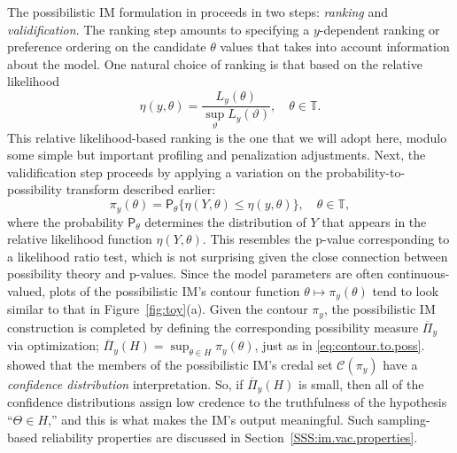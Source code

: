 \documentclass[12pt]{article}
\def\TT{\mathbb{T}}
\def\prob{\mathsf{P}}
\def\cred{\mathscr{C}}
\def\uPi{\overline{\Pi}}
\begin{document}
The possibilistic IM formulation in \citet{martin2022valid2} proceeds in two steps: {\em ranking} and {\em validification}.  The ranking step amounts to specifying a $y$-dependent ranking or preference ordering on the candidate $\theta$ values that takes into account information about the model.  One natural choice of ranking is that based on the relative likelihood 
\begin{equation}
\label{eq:rellik}
\eta(y,\theta) = \frac{L_y(\theta)}{\sup_\vartheta L_y(\vartheta)}, \quad \theta \in \TT.
\end{equation}
This relative likelihood-based ranking is the one that we will adopt here, modulo some simple but important profiling and penalization adjustments.  Next, the validification step proceeds by applying a variation on the probability-to-possibility transform described earlier:
\begin{equation}
\label{eq:contour0}
\pi_y(\theta) = \prob_\theta\{ \eta(Y,\theta) \leq \eta(y,\theta) \}, \quad \theta \in \TT,
\end{equation}
where the probability $\prob_\theta$ determines the distribution of $Y$ that appears in the relative likelihood function $\eta(Y,\theta)$.  This resembles the p-value corresponding to a likelihood ratio test, which is not surprising given the close connection between possibility theory and p-values.  Since the model parameters are often continuous-valued, plots of the possibilistic IM's contour function $\theta \mapsto \pi_y(\theta)$ tend to look similar to that in Figure~\ref{fig:toy}(a).  Given the contour $\pi_y$, the possibilistic IM construction is completed by defining the corresponding possibility measure $\uPi_y$ via optimization; $\uPi_y(H) = \sup_{\theta \in H} \pi_y(\theta)$, just as in \eqref{eq:contour.to.poss}.  \citet{martin2022valid1} showed that the members of the possibilistic IM's credal set $\cred(\pi_y)$ have a {\em confidence distribution} interpretation.  So, if $\uPi_y(H)$ is small, then all of the confidence distributions assign low credence to the truthfulness of the hypothesis ``$\Theta \in H$,'' and this is what makes the IM's output meaningful.  Such sampling-based reliability properties are discussed in Section~\ref{SSS:im.vac.properties}. 
\end{document}
